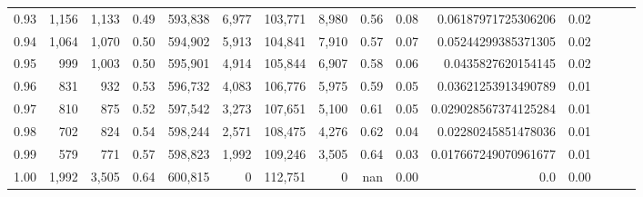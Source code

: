 \begin{tabular}{rrrrrrrrrrrrrrr}
0.93 &   1,156 &  1,133 &  0.49 &  593,838 &    6,977 &  103,771 &    8,980 &  0.56 &  0.08 &   0.06187971725306206 &      0.02 \\
0.94 &   1,064 &  1,070 &  0.50 &  594,902 &    5,913 &  104,841 &    7,910 &  0.57 &  0.07 &   0.05244299385371305 &      0.02 \\
0.95 &     999 &  1,003 &  0.50 &  595,901 &    4,914 &  105,844 &    6,907 &  0.58 &  0.06 &    0.0435827620154145 &      0.02 \\
0.96 &     831 &    932 &  0.53 &  596,732 &    4,083 &  106,776 &    5,975 &  0.59 &  0.05 &   0.03621253913490789 &      0.01 \\
0.97 &     810 &    875 &  0.52 &  597,542 &    3,273 &  107,651 &    5,100 &  0.61 &  0.05 &  0.029028567374125284 &      0.01 \\
0.98 &     702 &    824 &  0.54 &  598,244 &    2,571 &  108,475 &    4,276 &  0.62 &  0.04 &   0.02280245851478036 &      0.01 \\
0.99 &     579 &    771 &  0.57 &  598,823 &    1,992 &  109,246 &    3,505 &  0.64 &  0.03 &  0.017667249070961677 &      0.01 \\
1.00 &   1,992 &  3,505 &  0.64 &  600,815 &        0 &  112,751 &        0 &   nan &  0.00 &                   0.0 &      0.00 \\
\bottomrule
\end{tabular}

